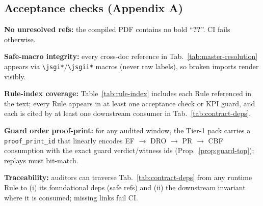 \subsection{Acceptance checks (Appendix A)}\label{app:resolution-accept}
\begin{acceptchecks}
\item \textbf{No unresolved refs:} the compiled PDF contains no bold “\textbf{??}”. CI fails otherwise.
\item \textbf{Safe-macro integrity:} every cross-doc reference in Tab.~\ref{tab:master-resolution} appears via \texttt{\textbackslash jsgi*}/\texttt{\textbackslash jsgii*} macros (never raw labels), so broken imports render visibly.
\item \textbf{Rule-index coverage:} Table~\ref{tab:rule-index} includes each Rule referenced in the text; every Rule appears in at least one acceptance check or KPI guard, and each is cited by at least one downstream consumer in Tab.~\ref{tab:contract-deps}.
\item \textbf{Guard order proof-print:} for any audited window, the Tier-1 pack carries a \texttt{proof\_print\_id} that linearly encodes EF $\rightarrow$ DRO $\rightarrow$ PR $\rightarrow$ CBF consumption with the exact guard verdict/witness ids (Prop.~\ref{prop:guard-top}); replays must bit-match.
\item \textbf{Traceability:} auditors can traverse Tab.~\ref{tab:contract-deps} from any runtime Rule to (i) its foundational deps (safe refs) and (ii) the downstream invariant where it is consumed; missing links fail CI.
\end{acceptchecks}
